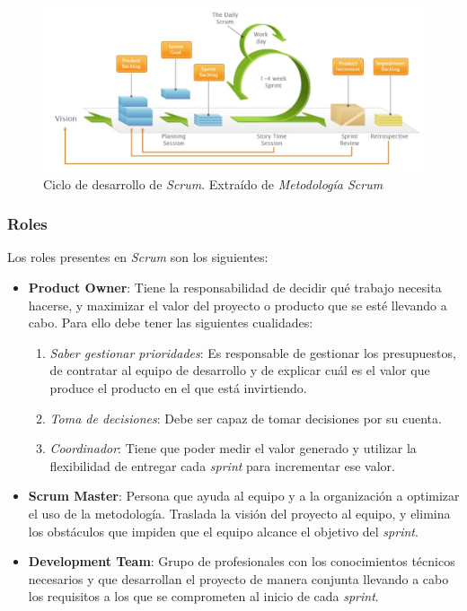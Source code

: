 \begin{figure}[H]
    \centering
    \includegraphics[width=14cm]{Images/Ciclo_Scrum.jpg}
    \caption{Ciclo de desarrollo de \textit{Scrum}. Extraído de \textit{Metodología Scrum} \autocite*{TrigasGallego2012}}
\end{figure}

\subsubsection{Roles}
Los roles presentes en \textit{Scrum} son los siguientes:
\begin{itemize}
    \item \textbf{Product Owner}: Tiene la responsabilidad de decidir qué trabajo necesita hacerse, y maximizar el valor 
    del proyecto o producto que se esté llevando a cabo. Para ello debe tener las siguientes cualidades:
    \begin{enumerate}
        \item \textit{Saber gestionar prioridades}: Es responsable de gestionar los presupuestos, de contratar al equipo de 
        desarrollo y de explicar cuál es el valor que produce el producto en el que está invirtiendo.
        \item \textit{Toma de decisiones}: Debe ser capaz de tomar decisiones por su cuenta.
        \item \textit{Coordinador}: Tiene que poder medir el valor generado y utilizar la flexibilidad de entregar cada 
        \textit{sprint} para incrementar ese valor.
    \end{enumerate}
    
    \item \textbf{Scrum Master}: Persona que ayuda al equipo y a la organización a optimizar el uso de la 
    metodología. Traslada la visión del proyecto al equipo, y elimina los obstáculos que impiden que el equipo alcance el 
    objetivo del \textit{sprint}.

    \item \textbf{Development Team}: Grupo de profesionales con los conocimientos técnicos necesarios y que desarrollan el proyecto de manera
    conjunta llevando a cabo los requisitos a los que se comprometen al inicio de cada \textit{sprint}.
\end{itemize}

